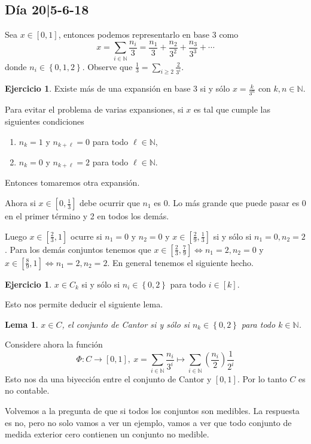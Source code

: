 \documentclass[12pt]{article}
\theoremstyle{plain}
\newtheorem{Lem}[Th]{Lema}             %
\theoremstyle{definition}
\newtheorem{Ej}[Th]{Ejercicio}
\theoremstyle{remark}
\numberwithin{equation}{section}
\newcommand{\bN}{\mathbb{N}}        %
\renewcommand{\geq}{\geqslant}      %
\renewcommand{\:}{\colon}           %
\newcommand{\conj}[1]{\left\lbrace#1\right\rbrace}
\newcommand{\bonj}[1]{\left\lbrack#1\right\rbrack}
\begin{document}
\begin{multicols}{2}
\subsection{Día 20|5-6-18}

Sea $x\in\bonj{0,1}$, entonces podemos representarlo en base 3 como
$$x=\sum_{i\in\bN}\frac{n_i}{3}=\frac{n_1}{3}+\frac{n_2}{3^2}+\frac{n_3}{3^3}+\cdots$$
 donde $n_i\in\conj{0,1,2}$. Observe que $\frac{1}{3}=\sum_{i\geq 2}\frac{2}{3^i}$.
\begin{Ej}
  Existe más de una expansión en base 3 si y sólo $x=\frac{k}{3^n}$ con $k,n\in\bN$.
\end{Ej}

Para evitar el problema de varias expansiones, si $x$ es tal que cumple las siguientes condiciones
\begin{enumerate}
  \item $n_k=1$ y $n_{k+\ell}=0$ para todo $\ell\in\bN$,
  \item $n_k=0$ y $n_{k+\ell}=2$ para todo $\ell\in\bN$.
\end{enumerate}
Entonces tomaremos otra expansión.\par
Ahora si $x\in\bonj{0,\frac{1}{3}}$ debe ocurrir que $n_1$ es 0. Lo más grande que puede pasar es 0 en el primer término y 2 en todos los demás. \par
Luego $x\in\bonj{\frac{2}{3},1}$ ocurre si $n_1=0$ y $n_2=0$ y $x\in\bonj{\frac{2}{9},\frac{1}{3}}$ si y sólo si $n_1=0, n_2=2$. Para los demás conjuntos tenemos que $x\in\bonj{\frac{2}{3},\frac{7}{9}}\iff n_1=2,n_2=0$ y $x\in\bonj{\frac{8}{9},1}\iff n_1=2,n_2=2$. En general tenemos el siguiente hecho.

\begin{Ej}
  $x\in C_k$ si y sólo si $n_i\in\conj{0,2}$ para todo $i\in\bonj{k}$.
\end{Ej}

Esto nos permite deducir el siguiente lema.
\begin{Lem}
  $x\in C$, el conjunto de Cantor si y sólo si $n_k\in\conj{0,2}$ para todo $k\in\bN$.
\end{Lem}

Considere ahora la función
$$\Phi\: C\to\bonj{0,1},\ x=\sum_{i\in\bN}\frac{n_i}{3^i}\mapsto\sum_{i\in\bN}\left(\frac{n_i}{2}\right)\frac{1}{2^i}$$
Esto nos da una biyección entre el conjunto de Cantor y $\bonj{0,1}$. Por lo tanto $C$ es no contable.\par

Volvemos a la pregunta de que si todos los conjuntos son medibles. La respuesta es no, pero no solo vamos a ver un ejemplo, vamos a ver que todo conjunto de medida exterior cero contienen un conjunto no medible.


\end{multicols}
\end{document}
